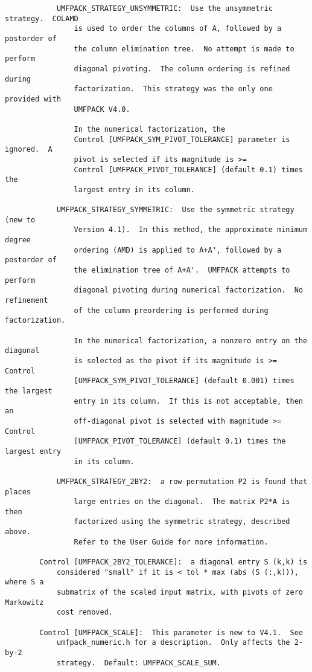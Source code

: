 \documentclass[11pt]{article}
\begin{document}
{\begin{verbatim}
            UMFPACK_STRATEGY_UNSYMMETRIC:  Use the unsymmetric strategy.  COLAMD
                is used to order the columns of A, followed by a postorder of
                the column elimination tree.  No attempt is made to perform
                diagonal pivoting.  The column ordering is refined during
                factorization.  This strategy was the only one provided with
                UMFPACK V4.0.

                In the numerical factorization, the
                Control [UMFPACK_SYM_PIVOT_TOLERANCE] parameter is ignored.  A
                pivot is selected if its magnitude is >=
                Control [UMFPACK_PIVOT_TOLERANCE] (default 0.1) times the
                largest entry in its column.

            UMFPACK_STRATEGY_SYMMETRIC:  Use the symmetric strategy (new to
                Version 4.1).  In this method, the approximate minimum degree
                ordering (AMD) is applied to A+A', followed by a postorder of
                the elimination tree of A+A'.  UMFPACK attempts to perform
                diagonal pivoting during numerical factorization.  No refinement
                of the column preordering is performed during factorization.

                In the numerical factorization, a nonzero entry on the diagonal
                is selected as the pivot if its magnitude is >= Control
                [UMFPACK_SYM_PIVOT_TOLERANCE] (default 0.001) times the largest
                entry in its column.  If this is not acceptable, then an
                off-diagonal pivot is selected with magnitude >= Control
                [UMFPACK_PIVOT_TOLERANCE] (default 0.1) times the largest entry
                in its column.

            UMFPACK_STRATEGY_2BY2:  a row permutation P2 is found that places
                large entries on the diagonal.  The matrix P2*A is then
                factorized using the symmetric strategy, described above.
                Refer to the User Guide for more information.

        Control [UMFPACK_2BY2_TOLERANCE]:  a diagonal entry S (k,k) is
            considered "small" if it is < tol * max (abs (S (:,k))), where S a
            submatrix of the scaled input matrix, with pivots of zero Markowitz
            cost removed.

        Control [UMFPACK_SCALE]:  This parameter is new to V4.1.  See
            umfpack_numeric.h for a description.  Only affects the 2-by-2
            strategy.  Default: UMFPACK_SCALE_SUM.


\end{verbatim}}
\end{document}
